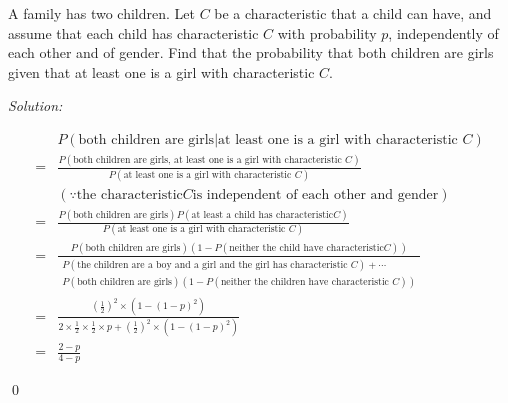 \documentclass[12pt]{article}
\newenvironment{problem}[2][Problem]{\begin{trivlist}
\item[\hskip \labelsep {\bfseries #1}\hskip \labelsep {\bfseries #2.}]}{\end{trivlist}}
\newenvironment{sol}
    {\emph{Solution:}
    }
    {
    \qed
    }
\begin{document}
\begin{problem}{9}
A family has two children. Let $C$ be a characteristic that a child can have, and assume that each child has
characteristic $C$ with probability $p$, independently of each other and of gender. Find that the probability that both children are girls
given that at least one is a girl with characteristic $C$.
\end{problem}
\begin{sol}
\begin{align*}
&P(\text{both children are girls}|\text{at least one is a girl with characteristic }C)\\
=&\frac{P(\text{both children are girls, at least one is a girl with characteristic }C)}{P(\text{at least one is a girl with characteristic }C)}\\
&(\because\text{the characteristic} C \text{is independent of each other and gender})\\
=&\frac{P(\text{both children are girls})P(\text{at least a child has characteristic} C)}{P(\text{at least one is a girl with characteristic }C)}\\
=&\frac{P(\text{both children are girls})(1-P(\text{neither the child have characteristic} C))}{\left.\begin{array}{l}P(\text{the children are a boy and a girl and the girl has characteristic }C)+\cdots\\P(\text{both children are girls})(1-P(\text{neither the children have characteristic }C))\end{array}\right.}\\
=&\frac{(\frac{1}{2})^2\times(1-(1-p)^2)}{2\times\frac{1}{2}\times\frac{1}{2}\times p+(\frac{1}{2})^2\times(1-(1-p)^2)}\\
=&\frac{2-p}{4-p}
\end{align*}
\end{sol}
\end{document}

